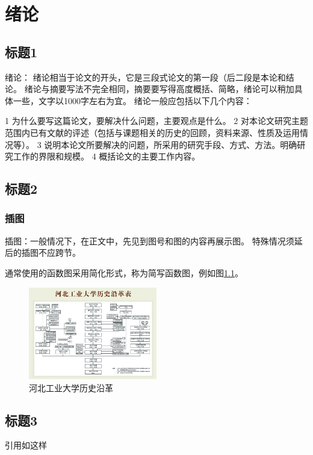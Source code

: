 \chapter{绪论}
\setcounter{page}{1}



\section{标题1}

绪论：
绪论相当于论文的开头，它是三段式论文的第一段（后二段是本论和结论。
绪论与摘要写法不完全相同，摘要要写得高度概括、简略，绪论可以稍加具体一些，文字以1000字左右为宜。
绪论一般应包括以下几个内容：

1 为什么要写这篇论文，要解决什么问题，主要观点是什么。
2 对本论文研究主题范围内已有文献的评述（包括与课题相关的历史的回顾，资料来源、性质及运用情况等）。
3 说明本论文所要解决的问题，所采用的研究手段、方式、方法。明确研究工作的界限和规模。
4 概括论文的主要工作内容。
\section{标题2}

\subsection{插图}
插图：一般情况下，在正文中，先见到图号和图的内容再展示图。
特殊情况须延后的插图不应跨节。

通常使用的函数图采用简化形式，称为简写函数图，例如图{\ref{fig:historyhebut}}。
\begin{figure}[ht]
    \centering
    \includegraphics[width=0.5\textwidth]{figures/historyhebut}
    \caption{河北工业大学历史沿革}\label{fig:historyhebut}
\end{figure}

\section{标题3}
引用如这样\cite{song_score-based_2020}
